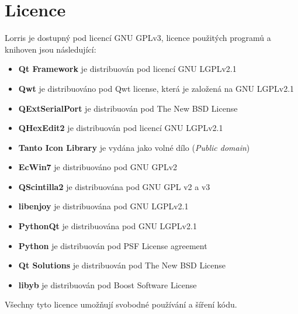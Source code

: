 \documentclass[12pt, a4paper, oneside]{article}
\newcommand{\It}{\textit}  %
\begin{document}
\section*{Licence}
Lorris je dostupný pod licencí GNU GPLv3\cite{gpl3}, licence použitých programů a knihoven jsou následující:
\begin{itemize}
    \item {\bf Qt Framework} je distribuován pod licencí GNU LGPLv2.1\cite{lgpl}
    \item {\bf Qwt} je distribuováno pod Qwt license\cite{qwtlicense}, která je založená na GNU LGPLv2.1
    \item {\bf QExtSerialPort} je distribuován pod The New BSD License\cite{newbsd}
    \item {\bf QHexEdit2} je distribuován pod licencí GNU LGPLv2.1
    \item {\bf Tanto Icon Library}\cite{tango} je vydána jako volné dílo (\It{Public domain})
    \item {\bf EcWin7} je distribuováno pod GNU GPLv2
    \item {\bf QScintilla2} je distribuována pod GNU GPL v2 a v3
    \item {\bf libenjoy}\cite{libenjoy} je distribuována pod GNU LGPLv2.1
    \item {\bf PythonQt} je distribuována pod GNU LGPLv2.1
    \item {\bf Python} je distribuován pod PSF License agreement\cite{psf}
    \item {\bf Qt Solutions} je distribuován pod The New BSD License
    \item {\bf libyb} je distribuován pod Boost Software License\cite{boost}
\end{itemize}

Všechny tyto licence umožňují svobodné používání a šíření kódu.

\newpage
\end{document}

